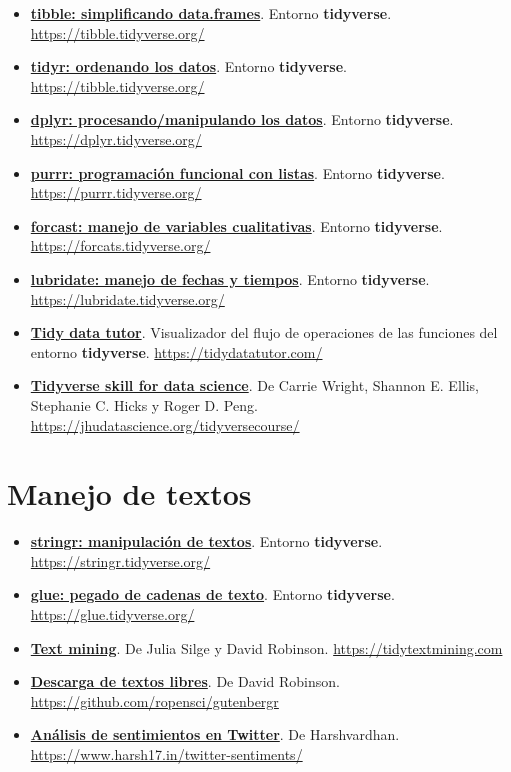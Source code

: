 \documentclass[11pt,]{book}
\begin{document}
\begin{itemize}
\item
  \href{https://tibble.tidyverse.org/}{\textbf{tibble: simplificando data.frames}}. Entorno \textbf{tidyverse}. \url{https://tibble.tidyverse.org/}
\item
  \href{https://tibble.tidyverse.org/}{\textbf{tidyr: ordenando los datos}}. Entorno \textbf{tidyverse}. \url{https://tibble.tidyverse.org/}
\item
  \href{https://dplyr.tidyverse.org/}{\textbf{dplyr: procesando/manipulando los datos}}. Entorno \textbf{tidyverse}. \url{https://dplyr.tidyverse.org/}
\item
  \href{https://purrr.tidyverse.org/}{\textbf{purrr: programación funcional con listas}}. Entorno \textbf{tidyverse}. \url{https://purrr.tidyverse.org/}
\item
  \href{https://forcats.tidyverse.org/}{\textbf{forcast: manejo de variables cualitativas}}. Entorno \textbf{tidyverse}. \url{https://forcats.tidyverse.org/}
\item
  \href{https://lubridate.tidyverse.org/}{\textbf{lubridate: manejo de fechas y tiempos}}. Entorno \textbf{tidyverse}. \url{https://lubridate.tidyverse.org/}
\item
  \href{https://tidydatatutor.com/}{\textbf{Tidy data tutor}}. Visualizador del flujo de operaciones de las funciones del entorno \textbf{tidyverse}. \url{https://tidydatatutor.com/}
\item
  \href{https://jhudatascience.org/tidyversecourse/}{\textbf{Tidyverse skill for data science}}. De Carrie Wright, Shannon E. Ellis, Stephanie C. Hicks y Roger D. Peng. \url{https://jhudatascience.org/tidyversecourse/}
\end{itemize}

\hypertarget{manejo-de-textos}{%
\section*{Manejo de textos}\label{manejo-de-textos}}


\begin{itemize}
\item
  \href{https://stringr.tidyverse.org/}{\textbf{stringr: manipulación de textos}}. Entorno \textbf{tidyverse}. \url{https://stringr.tidyverse.org/}
\item
  \href{https://glue.tidyverse.org/}{\textbf{glue: pegado de cadenas de texto}}. Entorno \textbf{tidyverse}. \url{https://glue.tidyverse.org/}
\item
  \href{tidytextmining.com}{\textbf{Text mining}}. De Julia Silge y David Robinson. \url{https://tidytextmining.com}
\item
  \href{https://github.com/ropensci/gutenbergr}{\textbf{Descarga de textos libres}}. De David Robinson. \url{https://github.com/ropensci/gutenbergr}
\item
  \href{https://www.harsh17.in/twitter-sentiments/}{\textbf{Análisis de sentimientos en Twitter}}. De Harshvardhan. \url{https://www.harsh17.in/twitter-sentiments/}
\end{itemize}
\end{document}
